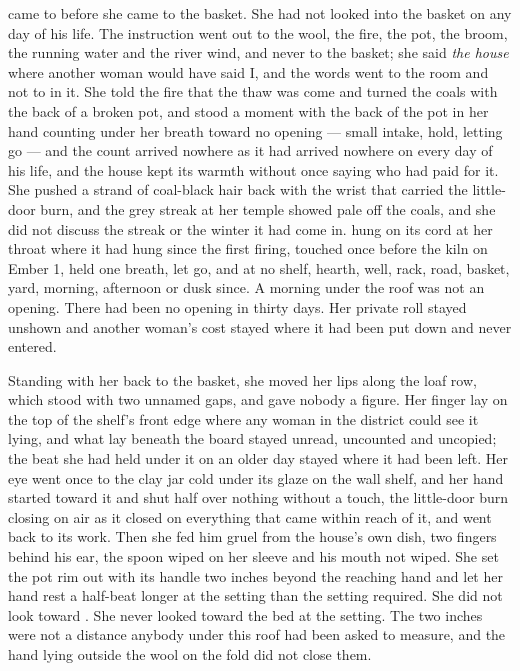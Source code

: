 \scenebreak

 came to  before she came to the basket. She had not looked into the basket on any day of his life. The instruction went out to the wool, the fire, the pot, the broom, the running water and the river wind, and never to the basket; she said \emph{the house} where another woman would have said I, and the words went to the room and not to  in it. She told the fire that the thaw was come and turned the coals with the back of a broken pot, and stood a moment with the back of the pot in her hand counting under her breath toward no opening --- small intake, hold, letting go --- and the count arrived nowhere as it had arrived nowhere on every day of his life, and the house kept its warmth without once saying who had paid for it. She pushed a strand of coal-black hair back with the wrist that carried the little-door burn, and the grey streak at her temple showed pale off the coals, and she did not discuss the streak or the winter it had come in.  hung on its cord at her throat where it had hung since the first firing, touched once before the kiln on Ember 1, held one breath, let go, and at no shelf, hearth, well, rack, road, basket, yard, morning, afternoon or dusk since. A morning under the roof was not an opening. There had been no opening in thirty days. Her private roll stayed unshown and another woman's cost stayed where it had been put down and never entered.

Standing with her back to the basket, she moved her lips along the loaf row, which stood with two unnamed gaps, and gave nobody a figure. Her finger lay on the top of the shelf's front edge where any woman in the district could see it lying, and what lay beneath the board stayed unread, uncounted and uncopied; the beat she had held under it on an older day stayed where it had been left. Her eye went once to the clay jar cold under its glaze on the wall shelf, and her hand started toward it and shut half over nothing without a touch, the little-door burn closing on air as it closed on everything that came within reach of it, and went back to its work. Then she fed him gruel from the house's own dish, two fingers behind his ear, the spoon wiped on her sleeve and his mouth not wiped. She set the pot rim out with its handle two inches beyond the reaching hand and let her hand rest a half-beat longer at the setting than the setting required. She did not look toward . She never looked toward the bed at the setting. The two inches were not a distance anybody under this roof had been asked to measure, and the hand lying outside the wool on the fold did not close them.

